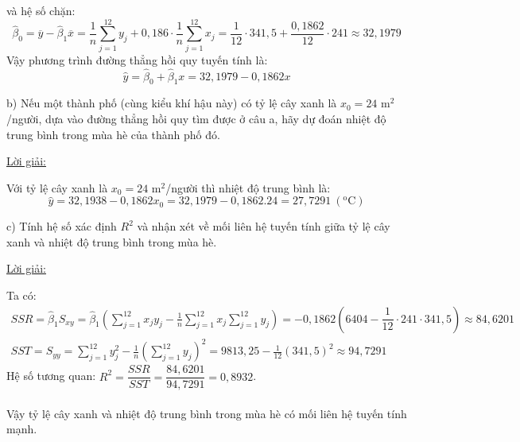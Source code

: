 \documentclass[10pt, a4paper]{article}
\begin{document}
và hệ số chặn: $$\hat\beta_0=\overline y-\hat\beta_1\overline x=\dfrac1n\displaystyle\sum_{j=1}^{12}y_j+0,186\cdot\dfrac1n\displaystyle\sum_{j=1}^{12}x_j=\dfrac{1}{12}\cdot341,5+\frac{0,1862}{12}\cdot241\approx32,1979$$
Vậy phương trình đường thẳng hồi quy tuyến tính là: $$\hat y=\hat\beta_0+\hat\beta_1x=32,1979-0,1862x$$
\vspace{0.1mm}
\begin{tcolorbox}[enhanced,colback=blue!5!white,colframe=blue!75!black,sharp corners=all,shadow={0mm}{0mm}{-1.5mm}%
{fill=blue!75!red,opacity=0.3}]
\color{red}b) \color{black}Nếu một thành phố (cùng kiểu khí hậu này) có tỷ lệ cây xanh là $x_0=24$ m$^2$/người, dựa vào đường thẳng hồi quy tìm được ở câu a, hãy dự đoán nhiệt độ trung bình trong mùa hè của thành phố đó.
\end{tcolorbox}
\begin{center}
	\color{blue}\underline{Lời giải:}
\end{center}
Với tỷ lệ cây xanh là $x_0=24$ m$^2$/người thì nhiệt độ trung bình là: $$\hat y=32,1938-0,1862x_0=32,1979-0,1862.24=27,7291~(^\text{o}\text{C})$$
\vspace{0.1mm}
\begin{tcolorbox}[enhanced,colback=blue!5!white,colframe=blue!75!black,sharp corners=all,shadow={0mm}{0mm}{-1.5mm}%
{fill=blue!75!red,opacity=0.3}]
\color{red}c) \color{black}Tính hệ số xác định $R^2$ và nhận xét về mối liên hệ tuyến tính giữa tỷ lệ cây xanh và nhiệt độ trung bình trong mùa hè.
\end{tcolorbox}
\begin{center}
	\color{blue}\underline{Lời giải:}
\end{center}
Ta có: \begin{gather*}
	SSR=\hat\beta_1S_{xy}=\hat\beta_1\left(\sum_{j=1}^{12}x_jy_j-\frac1n\sum_{j=1}^{12}x_j\sum_{j=1}^{12}y_j\right)=-0,1862\left(6404-\dfrac{1}{12}\cdot241\cdot341,5\right)\approx84,6201\\
	SST=S_{yy}=\sum_{j=1}^{12}y_j^2-\frac1n\left(\sum_{j=1}^{12}y_j\right)^2=9813,25-\frac{1}{12}(341,5)^2\approx94,7291
\end{gather*}
Hệ số tương quan: $R^2=\dfrac{SSR}{SST}=\dfrac{84,6201}{94,7291}=0,8932$.\\\\
Vậy tỷ lệ cây xanh và nhiệt độ trung bình trong mùa hè có mối liên hệ tuyến tính mạnh.
\vspace{3mm}
\end{document}
